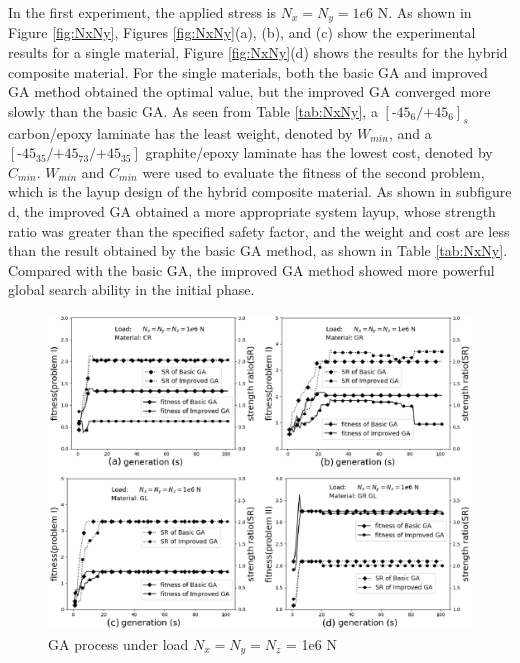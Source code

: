 \documentclass[Afour,sagev,times]{sagej}
\begin{document}
In the first experiment, the applied stress is $N_x=N_y=1e6$ N. As shown in
Figure \ref{fig:NxNy}, Figures \ref{fig:NxNy}(a), (b), and (c) show the experimental results for a single material,
Figure \ref{fig:NxNy}(d) shows the results for the hybrid composite material.
 For the single materials, both the basic GA and improved
GA method obtained the optimal value, but the improved GA converged more slowly than the basic GA.
As seen from Table \ref{tab:NxNy}, a $[\text{-}45_{6}/\text{+}45_{6}]_s$ carbon/epoxy
laminate has the least weight, denoted by $W_{min}$, and a
$[\text{-}45_{35}/\text{+}45_{73}/\text{+}45_{35}]$ graphite/epoxy laminate has the lowest cost,
denoted by $C_{min}$. $W_{min}$ and $C_{min}$ were used to evaluate the fitness of the second
problem, which is the layup design of the hybrid composite material. As shown in subfigure d, the
improved GA obtained a more appropriate system layup, whose strength ratio was greater than the
specified safety factor, and the weight and cost are less than the result obtained by the basic GA method, as
shown in Table \ref{tab:NxNy}.
 Compared with the basic GA, the improved GA method showed more powerful
global search ability in the initial phase.

\begin{figure}
  \includegraphics[width=\linewidth]{NxNyNz}
  \caption{GA process under load  $N_x=N_y=N_z$ = 1e6 N}
  \label{fig:NxNyNz}
\end{figure}
\end{document}
